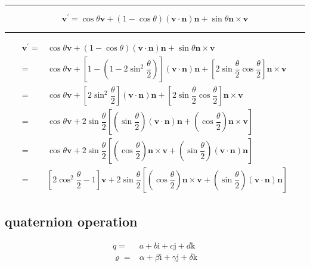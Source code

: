 \documentclass[
]{book}
\theoremstyle{definition}
\theoremstyle{definition}
\theoremstyle{definition}
\theoremstyle{definition}
\theoremstyle{remark}
\begin{document}
\begin{center}\rule{0.5\linewidth}{0.5pt}\end{center}

\[
\boldsymbol{v}^{\prime}=\cos\theta\boldsymbol{v}+\left(1-\cos\theta\right)\left(\boldsymbol{v}\cdot\boldsymbol{n}\right)\boldsymbol{n}+\sin\theta\boldsymbol{n}\times\boldsymbol{v}
\]

\begin{center}\rule{0.5\linewidth}{0.5pt}\end{center}

\[
\begin{aligned}
\boldsymbol{v}^{\prime}= & \cos\theta\boldsymbol{v}+\left(1-\cos\theta\right)\left(\boldsymbol{v}\cdot\boldsymbol{n}\right)\boldsymbol{n}+\sin\theta\boldsymbol{n}\times\boldsymbol{v}\\
= & \cos\theta\boldsymbol{v}+\left[1-\left(1-2\sin^{2}\dfrac{\theta}{2}\right)\right]\left(\boldsymbol{v}\cdot\boldsymbol{n}\right)\boldsymbol{n}+\left[2\sin\dfrac{\theta}{2}\cos\dfrac{\theta}{2}\right]\boldsymbol{n}\times\boldsymbol{v}\\
= & \cos\theta\boldsymbol{v}+\left[2\sin^{2}\dfrac{\theta}{2}\right]\left(\boldsymbol{v}\cdot\boldsymbol{n}\right)\boldsymbol{n}+\left[2\sin\dfrac{\theta}{2}\cos\dfrac{\theta}{2}\right]\boldsymbol{n}\times\boldsymbol{v}\\
= & \cos\theta\boldsymbol{v}+2\sin\dfrac{\theta}{2}\left[\left(\sin\dfrac{\theta}{2}\right)\left(\boldsymbol{v}\cdot\boldsymbol{n}\right)\boldsymbol{n}+\left(\cos\dfrac{\theta}{2}\right)\boldsymbol{n}\times\boldsymbol{v}\right]\\
= & \cos\theta\boldsymbol{v}+2\sin\dfrac{\theta}{2}\left[\left(\cos\dfrac{\theta}{2}\right)\boldsymbol{n}\times\boldsymbol{v}+\left(\sin\dfrac{\theta}{2}\right)\left(\boldsymbol{v}\cdot\boldsymbol{n}\right)\boldsymbol{n}\right]\\
= & \left[2\cos^{2}\dfrac{\theta}{2}-1\right]\boldsymbol{v}+2\sin\dfrac{\theta}{2}\left[\left(\cos\dfrac{\theta}{2}\right)\boldsymbol{n}\times\boldsymbol{v}+\left(\sin\dfrac{\theta}{2}\right)\left(\boldsymbol{v}\cdot\boldsymbol{n}\right)\boldsymbol{n}\right]
\end{aligned}
\]

\subsection{quaternion operation}\label{quaternion-operation}

\[
\begin{aligned}
q= & a+b\mathrm{i}+c\mathrm{j}+d\mathrm{k}\\
\varrho= & \alpha+\beta\mathrm{i}+\gamma\mathrm{j}+\delta\mathrm{k}
\end{aligned}
\]
\end{document}
